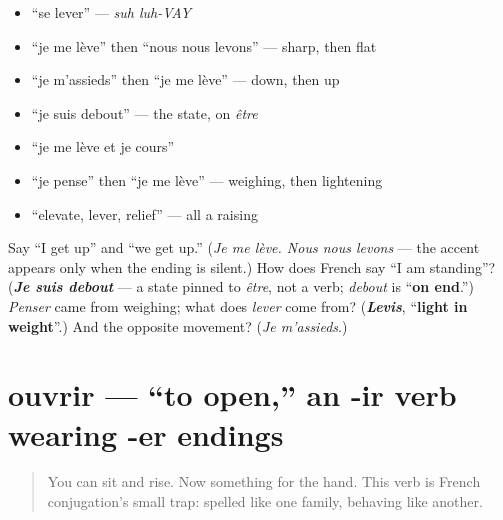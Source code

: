 \begin{itemize}
\raggedright
  \item \textquotedblleft{}se lever\textquotedblright{} — \emph{suh luh-VAY}
  \item \textquotedblleft{}je me lève\textquotedblright{} then \textquotedblleft{}nous nous levons\textquotedblright{} — sharp, then flat
  \item \textquotedblleft{}je m'assieds\textquotedblright{} then \textquotedblleft{}je me lève\textquotedblright{} — down, then up
  \item \textquotedblleft{}je suis debout\textquotedblright{} — the state, on \emph{être}
  \item \textquotedblleft{}je me lève et je cours\textquotedblright{}
  \item \textquotedblleft{}je pense\textquotedblright{} then \textquotedblleft{}je me lève\textquotedblright{} — weighing, then lightening
  \item \textquotedblleft{}elevate, lever, relief\textquotedblright{} — all a raising
\end{itemize}

\begin{tcolorbox}[breakable,colback=teal!4,colframe=teal!35!black,title={Before you move on}]
Say \textquotedblleft{}I get up\textquotedblright{} and \textquotedblleft{}we get up.\textquotedblright{} (\emph{Je me lève. Nous nous levons} — the accent appears only when the ending is silent.) How does French say \textquotedblleft{}I am standing\textquotedblright{}? (\emph{\textbf{Je suis debout}} — a state pinned to \emph{être}, not a verb; \emph{debout} is \textquotedblleft{}\textbf{on end}.\textquotedblright{}) \emph{Penser} came from weighing; what does \emph{lever} come from? (\emph{\textbf{Levis}}, \textquotedblleft{}\textbf{light in weight}\textquotedblright{}.) And the opposite movement? (\emph{Je m'assieds}.)
\end{tcolorbox}
\section[ouvrir]{ouvrir — \textquotedblleft{}to open,\textquotedblright{} an -ir verb wearing -er endings}

\label{lesson:FR-C27-ouvrir}



\begin{quote}
You can sit and rise. Now something for the hand. This verb is French conjugation's small trap: spelled like one family, behaving like another.
\end{quote}

